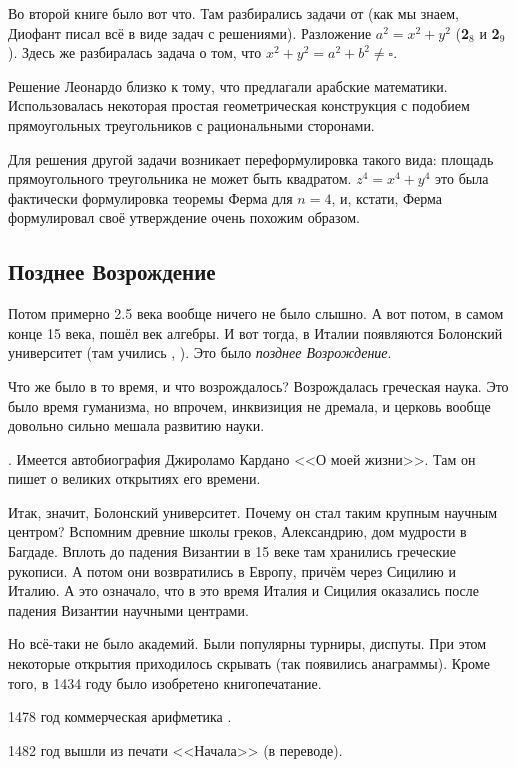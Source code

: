 \documentclass[a4paper,oneside,fleqn,10pt]{article}
\begin{document}
Во второй книге было вот что. Там разбирались задачи от
 (как мы знаем, Диофант писал всё в виде
задач с решениями).  Разложение $a^2 = x^2 + y^2$ (\textbf{2}$_8$ и
\textbf{2}$_9$).  Здесь же разбиралась задача о том, что $x^2 + y^2 =
a^2 + b^2 \ne \square$.

Решение Леонардо близко к тому, что предлагали арабские математики.
Использовалась некоторая простая геометрическая конструкция с подобием
прямоугольных треугольников с рациональными сторонами.

Для решения другой задачи возникает переформулировка такого вида:
площадь прямоугольного треугольника не может быть квадратом. $z^4 =
x^4 + y^4$ это была фактически формулировка теоремы Ферма для $n=4$,
и, кстати, Ферма формулировал своё утверждение очень похожим образом.

\subsection{Позднее Возрождение}

Потом примерно 2.5 века вообще ничего не было слышно. А вот потом, в
самом конце 15 века, пошёл век алгебры. И вот тогда, в Италии
появляются Болонский университет (там учились , ).  Это было \emph{позднее
  Возрождение}.

Что же было в то время, и что возрождалось? Возрождалась греческая
наука.  Это было время гуманизма, но впрочем, инквизиция не дремала, и
церковь вообще довольно сильно мешала развитию науки.

. Имеется автобиография Джироламо Кардано <<О моей
жизни>>. Там он пишет о великих открытиях его времени.

Итак, значит, Болонский университет. Почему он стал таким крупным
научным центром?  Вспомним древние школы греков, Александрию, дом
мудрости в Багдаде. Вплоть до падения Византии в 15 веке там
хранились греческие рукописи. А потом они возвратились в Европу,
причём через Сицилию и Италию. А это означало, что в это время Италия
и Сицилия оказались после падения Византии научными центрами.

Но всё-таки не было академий. Были популярны турниры, диспуты. При
этом некоторые открытия приходилось скрывать (так появились
анаграммы). Кроме того, в 1434 году было изобретено книгопечатание.

1478 год коммерческая арифметика .

1482 год вышли из печати <<Начала>> (в переводе).
\end{document}
